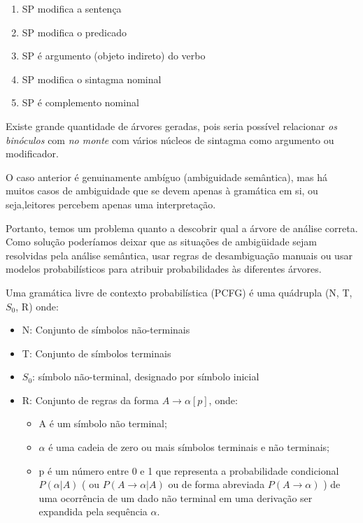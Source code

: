 \begin{enumerate}
    \tiny
    \item SP modifica a sentença
    \item SP modifica o predicado
    \item SP é argumento (objeto indireto) do verbo
    \item SP modifica o sintagma nominal
    \item SP é complemento nominal
\end{enumerate}

Existe grande quantidade de árvores geradas, pois seria possível relacionar \emph{os binóculos} com \emph{no monte} com vários núcleos de sintagma como argumento ou modificador.

O caso anterior é genuinamente ambíguo (ambiguidade semântica), mas há muitos casos de ambiguidade que se devem apenas à gramática em si, ou seja,leitores percebem apenas uma interpretação.

Portanto, temos um problema quanto a descobrir qual a árvore de análise correta. Como solução poderíamos deixar que as situações de ambigüidade sejam resolvidas pela análise semântica, usar regras de desambiguação manuais ou usar modelos probabilísticos para atribuir probabilidades às diferentes árvores.

Uma gramática livre de contexto probabilística (PCFG) é uma quádrupla (N, T, $S_0$, R) onde:

 \begin{itemize}

   \item N: Conjunto de símbolos não-terminais
   \item T: Conjunto de símbolos terminais
   \item $S_0$: símbolo não-terminal, designado por símbolo inicial
   \item R: Conjunto de regras da forma $ A \rightarrow \alpha [p] $, onde:

    \begin{itemize}
      \item A é um símbolo não terminal;
      \item  $\alpha$ é uma cadeia de zero ou mais símbolos terminais e não terminais;
      \item p é um número entre 0 e 1 que representa a probabilidade condicional $P(\alpha | A)$ ( ou $P(A \rightarrow \alpha | A)$  ou de forma abreviada $P(A \rightarrow \alpha)$ ) de uma ocorrência de um dado não terminal em uma derivação ser expandida pela sequência $\alpha$.
    \end{itemize}

 \end{itemize}


